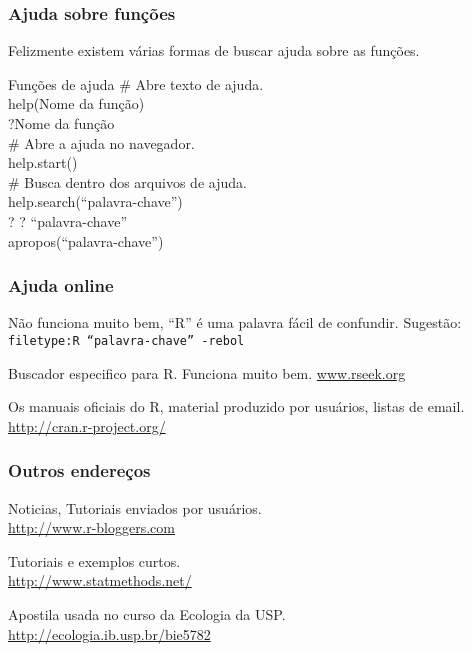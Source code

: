 \documentclass[handout]{beamer}
\begin{document}
\begin{frame}
  \frametitle{Ajuda sobre funções}
   Felizmente existem várias formas de buscar ajuda sobre as funções.
   \begin{block}{Funções de ajuda}
      \# Abre texto de ajuda. \\
      help(Nome da função)\\
     ?Nome da função    \\
     \vspace{10pt}
      \# Abre a ajuda no navegador.\\
       help.start() \\
     \vspace{10pt}
      \# Busca dentro dos arquivos de ajuda.\\
        help.search(``palavra-chave'')\\
        ? ? ``palavra-chave'' \\
       apropos(``palavra-chave'')
   \end{block}
\end{frame}
\begin{frame}
  \frametitle{Ajuda online}
  \begin{description}[<+->]
    \item[Google] Não funciona muito bem, ``R'' é uma palavra fácil de confundir. Sugestão:\\ \texttt{filetype:R ``palavra-chave'' -rebol}
      \item[Rseek] Buscador especifico para R. Funciona muito bem. \url{www.rseek.org}
      \item[Site do R] Os manuais oficiais do R, material produzido por usuários, listas de email.\\
     \url{http://cran.r-project.org/}  
  \end{description}
\end{frame}
\begin{frame}
  \frametitle{Outros endereços}
  \begin{description}[<+->]
     \item[R-bloggers] Noticias, Tutoriais enviados por usuários.\\
           \url{http://www.r-bloggers.com}
     \item[Quick-R] Tutoriais e exemplos curtos.\\
          \url{http://www.statmethods.net/}
    \item[Apostila online] Apostila usada no curso da Ecologia da USP. \\
         \url{http://ecologia.ib.usp.br/bie5782}
    \end{description}
\end{frame}
\end{document}
